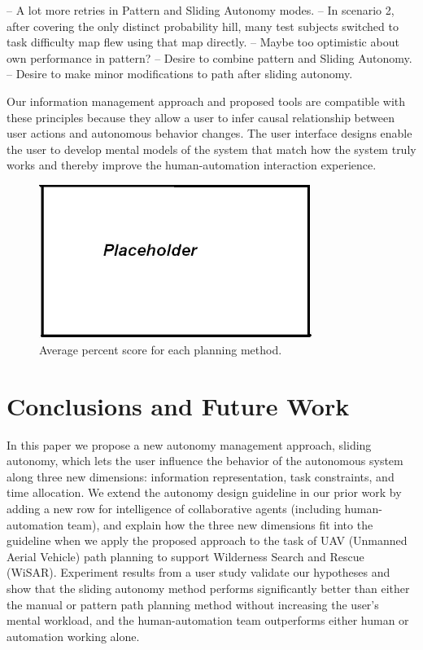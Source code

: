 \documentclass[journal]{IEEEtran}
\begin{document}
-- A lot more retries in Pattern and Sliding Autonomy modes.
-- In scenario 2, after covering the only distinct probability hill, many test subjects switched to task difficulty map flew using that map directly.
-- Maybe too optimistic about own performance in pattern?
-- Desire to combine pattern and Sliding Autonomy.
-- Desire to make minor modifications to path after sliding autonomy.

Our information management approach and proposed tools are compatible with these principles because they allow a user to infer causal relationship between user actions and autonomous behavior changes. The user interface designs enable the user to develop mental models of the system that match how the system truly works and thereby improve the human-automation interaction experience.


\begin{figure}
\centering
\includegraphics[width=3.5in]{placeholder.JPG}
\caption{Average percent score for each planning method.}
\label{PercentScoreGraph}
\end{figure}



\section{Conclusions and Future Work} 
\label{sec:Conclusions6}

In this paper we propose a new autonomy management approach, sliding autonomy, which lets the user influence the behavior of the autonomous system along three new dimensions: information representation, task constraints, and time allocation. We extend the autonomy design guideline in our prior work by adding a new row for intelligence of collaborative agents (including human-automation team), and explain how the three new dimensions fit into the guideline when we apply the proposed approach to the task of UAV (Unmanned Aerial Vehicle) path planning to support Wilderness Search and Rescue (WiSAR). Experiment results from a user study validate our hypotheses and show that the sliding autonomy method performs significantly better than either the manual or pattern path planning method without increasing the user's mental workload, and the human-automation team outperforms either human or automation working alone.
\end{document}
